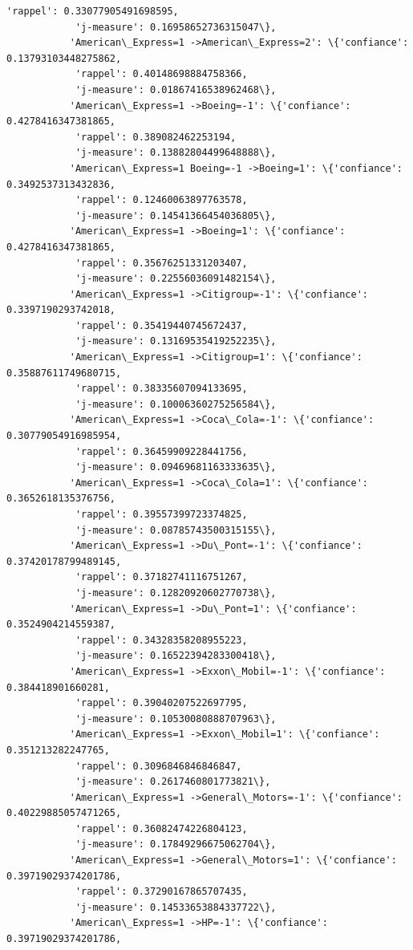 \documentclass[11pt]{article}
\begin{document}
\begin{Verbatim}[commandchars=\\\{\}]
            'rappel': 0.33077905491698595,
            'j-measure': 0.16958652736315047\},
           'American\_Express=1 ->American\_Express=2': \{'confiance': 0.13793103448275862,
            'rappel': 0.40148698884758366,
            'j-measure': 0.01867416538962468\},
           'American\_Express=1 ->Boeing=-1': \{'confiance': 0.4278416347381865,
            'rappel': 0.389082462253194,
            'j-measure': 0.13882804499648888\},
           'American\_Express=1 Boeing=-1 ->Boeing=1': \{'confiance': 0.3492537313432836,
            'rappel': 0.12460063897763578,
            'j-measure': 0.14541366454036805\},
           'American\_Express=1 ->Boeing=1': \{'confiance': 0.4278416347381865,
            'rappel': 0.35676251331203407,
            'j-measure': 0.22556036091482154\},
           'American\_Express=1 ->Citigroup=-1': \{'confiance': 0.3397190293742018,
            'rappel': 0.35419440745672437,
            'j-measure': 0.13169535419252235\},
           'American\_Express=1 ->Citigroup=1': \{'confiance': 0.35887611749680715,
            'rappel': 0.38335607094133695,
            'j-measure': 0.10006360275256584\},
           'American\_Express=1 ->Coca\_Cola=-1': \{'confiance': 0.30779054916985954,
            'rappel': 0.36459909228441756,
            'j-measure': 0.09469681163333635\},
           'American\_Express=1 ->Coca\_Cola=1': \{'confiance': 0.3652618135376756,
            'rappel': 0.39557399723374825,
            'j-measure': 0.08785743500315155\},
           'American\_Express=1 ->Du\_Pont=-1': \{'confiance': 0.37420178799489145,
            'rappel': 0.37182741116751267,
            'j-measure': 0.12820920602770738\},
           'American\_Express=1 ->Du\_Pont=1': \{'confiance': 0.3524904214559387,
            'rappel': 0.34328358208955223,
            'j-measure': 0.16522394283300418\},
           'American\_Express=1 ->Exxon\_Mobil=-1': \{'confiance': 0.384418901660281,
            'rappel': 0.39040207522697795,
            'j-measure': 0.10530080888707963\},
           'American\_Express=1 ->Exxon\_Mobil=1': \{'confiance': 0.351213282247765,
            'rappel': 0.3096846846846847,
            'j-measure': 0.2617460801773821\},
           'American\_Express=1 ->General\_Motors=-1': \{'confiance': 0.40229885057471265,
            'rappel': 0.36082474226804123,
            'j-measure': 0.17849296675062704\},
           'American\_Express=1 ->General\_Motors=1': \{'confiance': 0.39719029374201786,
            'rappel': 0.37290167865707435,
            'j-measure': 0.14533653884337722\},
           'American\_Express=1 ->HP=-1': \{'confiance': 0.39719029374201786,

\end{Verbatim}
\end{document}
